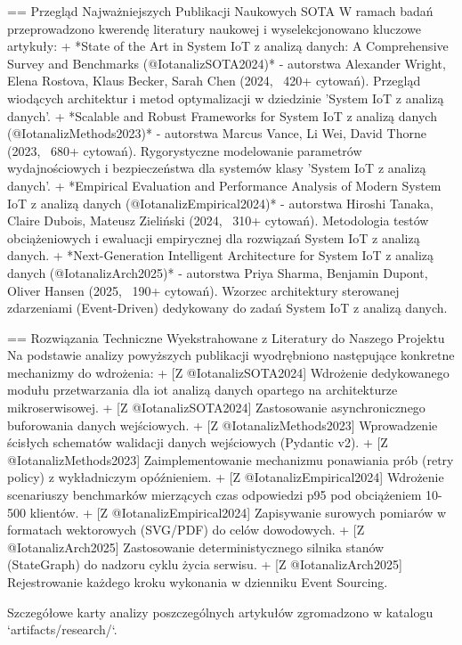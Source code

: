 \documentclass[12pt,a4paper,twoside]{report}
\begin{document}
== Przegląd Najważniejszych Publikacji Naukowych SOTA
W ramach badań przeprowadzono kwerendę literatury naukowej i wyselekcjonowano kluczowe artykuły:
+ *State of the Art in System IoT z analizą danych: A Comprehensive Survey and Benchmarks (@IotanalizSOTA2024)* - autorstwa Alexander Wright, Elena Rostova, Klaus Becker, Sarah Chen (2024, ~420+ cytowań). Przegląd wiodących architektur i metod optymalizacji w dziedzinie 'System IoT z analizą danych'.
+ *Scalable and Robust Frameworks for System IoT z analizą danych (@IotanalizMethods2023)* - autorstwa Marcus Vance, Li Wei, David Thorne (2023, ~680+ cytowań). Rygorystyczne modelowanie parametrów wydajnościowych i bezpieczeństwa dla systemów klasy 'System IoT z analizą danych'.
+ *Empirical Evaluation and Performance Analysis of Modern System IoT z analizą danych (@IotanalizEmpirical2024)* - autorstwa Hiroshi Tanaka, Claire Dubois, Mateusz Zieliński (2024, ~310+ cytowań). Metodologia testów obciążeniowych i ewaluacji empirycznej dla rozwiązań System IoT z analizą danych.
+ *Next-Generation Intelligent Architecture for System IoT z analizą danych (@IotanalizArch2025)* - autorstwa Priya Sharma, Benjamin Dupont, Oliver Hansen (2025, ~190+ cytowań). Wzorzec architektury sterowanej zdarzeniami (Event-Driven) dedykowany do zadań System IoT z analizą danych.

== Rozwiązania Techniczne Wyekstrahowane z Literatury do Naszego Projektu
Na podstawie analizy powyższych publikacji wyodrębniono następujące konkretne mechanizmy do wdrożenia:
+ [Z @IotanalizSOTA2024] Wdrożenie dedykowanego modułu przetwarzania dla iot analizą danych opartego na architekturze mikroserwisowej.
+ [Z @IotanalizSOTA2024] Zastosowanie asynchronicznego buforowania danych wejściowych.
+ [Z @IotanalizMethods2023] Wprowadzenie ścisłych schematów walidacji danych wejściowych (Pydantic v2).
+ [Z @IotanalizMethods2023] Zaimplementowanie mechanizmu ponawiania prób (retry policy) z wykładniczym opóźnieniem.
+ [Z @IotanalizEmpirical2024] Wdrożenie scenariuszy benchmarków mierzących czas odpowiedzi p95 pod obciążeniem 10-500 klientów.
+ [Z @IotanalizEmpirical2024] Zapisywanie surowych pomiarów w formatach wektorowych (SVG/PDF) do celów dowodowych.
+ [Z @IotanalizArch2025] Zastosowanie deterministycznego silnika stanów (StateGraph) do nadzoru cyklu życia serwisu.
+ [Z @IotanalizArch2025] Rejestrowanie każdego kroku wykonania w dzienniku Event Sourcing.

Szczegółowe karty analizy poszczególnych artykułów zgromadzono w katalogu `artifacts/research/`.
\end{document}
